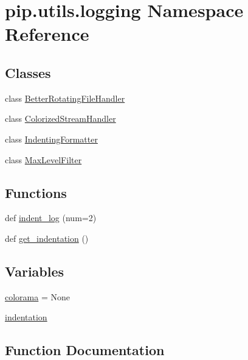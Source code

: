 \hypertarget{namespacepip_1_1utils_1_1logging}{}\section{pip.\+utils.\+logging Namespace Reference}
\label{namespacepip_1_1utils_1_1logging}
\subsection*{Classes}
\begin{DoxyCompactItemize}
\item 
class \hyperlink{classpip_1_1utils_1_1logging_1_1_better_rotating_file_handler}{Better\+Rotating\+File\+Handler}
\item 
class \hyperlink{classpip_1_1utils_1_1logging_1_1_colorized_stream_handler}{Colorized\+Stream\+Handler}
\item 
class \hyperlink{classpip_1_1utils_1_1logging_1_1_indenting_formatter}{Indenting\+Formatter}
\item 
class \hyperlink{classpip_1_1utils_1_1logging_1_1_max_level_filter}{Max\+Level\+Filter}
\end{DoxyCompactItemize}
\subsection*{Functions}
\begin{DoxyCompactItemize}
\item 
def \hyperlink{namespacepip_1_1utils_1_1logging_aa1d1a9e2e66e0695b67ff789cbc04e62}{indent\+\_\+log} (num=2)
\item 
def \hyperlink{namespacepip_1_1utils_1_1logging_af6dfec4b00c5334bfa735477b65f87f4}{get\+\_\+indentation} ()
\end{DoxyCompactItemize}
\subsection*{Variables}
\begin{DoxyCompactItemize}
\item 
\hyperlink{namespacepip_1_1utils_1_1logging_a6ca18eef2480c37568fdc6c23fb94cd2}{colorama} = None
\item 
\hyperlink{namespacepip_1_1utils_1_1logging_ab26b178c5bcbfb8dd41c500dd7ba9c07}{indentation}
\end{DoxyCompactItemize}


\subsection{Function Documentation}
\mbox{\label{namespacepip_1_1utils_1_1logging_af6dfec4b00c5334bfa735477b65f87f4}} 
